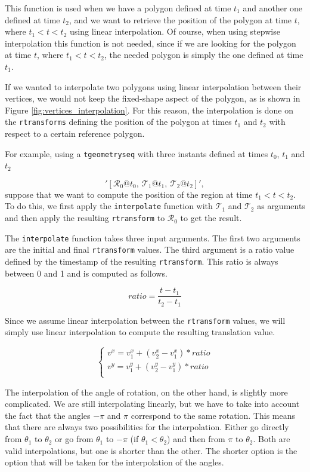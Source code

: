 This function is used when we have a polygon defined at time $t_1$ and another one defined at time $t_2$, and we want to retrieve the position of the polygon at time $t$, where $t_1 < t < t_2$ using linear interpolation. Of course, when using stepwise interpolation this function is not needed, since if we are looking for the polygon at time $t$, where $t_1 < t < t_2$, the needed polygon is simply the one defined at time $t_1$.

If we wanted to interpolate two polygons using linear interpolation between their vertices, we would not keep the fixed-shape aspect of the polygon, as is shown in Figure \ref{fig:vertices_interpolation}. For this reason, the interpolation is done on the \lstinline{rtransforms} defining the position of the polygon at times $t_1$ and $t_2$ with respect to a certain reference polygon.

For example, using a \lstinline{tgeometryseq} with three instants defined at times $t_0$, $t_1$ and $t_2$

\[
    '[\mathcal{R}_0@t_0,\ \mathcal{T}_1@t_1,\ \mathcal{T}_2@t_2]', 
\]
suppose that we want to compute the position of the region at time $t_1 < t < t_2$. To do this, we first apply the \lstinline{interpolate} function with $\mathcal{T}_1$ and $\mathcal{T}_2$ as arguments and then apply the resulting \lstinline{rtransform} to $\mathcal{R}_0$ to get the result.

The \lstinline{interpolate} function takes three input arguments. The first two arguments are the initial and final \lstinline{rtransform} values. The third argument is a ratio value defined by the timestamp of the resulting \lstinline+rtransform+. This ratio is always between 0 and 1 and is computed as follows.

\[
    ratio = \frac{t - t_1}{t_2 - t_1}
\]

Since we assume linear interpolation between the \lstinline{rtransform} values, we will simply use linear interpolation to compute the resulting translation value.

\[
    \begin{cases}
        v^x = v_1^x + (v_2^x - v_1^x) * ratio \\
        v^y = v_1^y + (v_2^y - v_1^y) * ratio \\
    \end{cases}
\]

The interpolation of the angle of rotation, on the other hand, is slightly more complicated. We are still interpolating linearly, but we have to take into account the fact that the angles $-\pi$ and $\pi$ correspond to the same rotation. This means that there are always two possibilities for the interpolation. Either go directly from $\theta_1$ to $\theta_2$ or go from $\theta_1$ to $-\pi$ (if $\theta_1 < \theta_2$) and then from $\pi$ to $\theta_2$. Both are valid interpolations, but one is shorter than the other. The shorter option is the option that will be taken for the interpolation of the angles.

